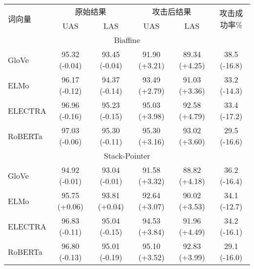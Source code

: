 \begin{table}[htbp]
    \vspace{0.5em}\centering\wuhao
	\begin{tabular}{lccccc}
		\toprule[1.5pt]
		\multirow{2}{*}{词向量}& \multicolumn{2}{c}{原始结果} & \multicolumn{2}{c}{攻击后结果} & \multirow{2}{*}{攻击成功率\%} \\
		\cmidrule(r){2-3} \cmidrule(r){4-5}
		& UAS & LAS & UAS & LAS & \\
		\midrule[1pt]
		\multicolumn{6}{c}{Biaffine} \\
		\hline
		GloVe &95.32 (-0.04) & 93.45 (-0.04) &91.90 (+3.21) &89.34 (+4.25) &38.5 (-16.8) \\
		ELMo &96.17 (-0.12) &94.37 (-0.14) &93.49 (+2.79) &91.03 (+3.36) &33.2 (-14.3) \\
		ELECTRA &96.96 (-0.16) & 95.23 (-0.15) &95.03 (+3.98) &92.58 (+4.79) &33.4 (-17.2) \\
		RoBERTa &97.03 (-0.06) & 95.30 (-0.11) &95.30 (+3.16) &93.02 (+3.60) &29.5 (-16.6) \\
		\hline
		\multicolumn{6}{c}{Stack-Pointer} \\
		\hline
		GloVe &94.92 (-0.01) & 93.04 (-0.01) &91.58 (+3.32) &88.82 (+4.18) &36.2 (-16.4) \\
		ELMo &95.75 (+0.06) & 93.81 (+0.04) &92.64 (+3.07) &90.02 (+3.53) &34.1 (-12.7) \\
		ELECTRA &96.83 (-0.11) & 95.04 (-0.15) &94.53 (+3.84) &91.96 (+4.49) &34.2 (-16.1) \\
		RoBERTa &96.80 (-0.13) & 95.01 (-0.19) &95.10 (+3.52) &92.83 (+3.99) &29.1 (-16.0) \\
		\bottomrule[1.5pt]
	\end{tabular}
\end{table}

